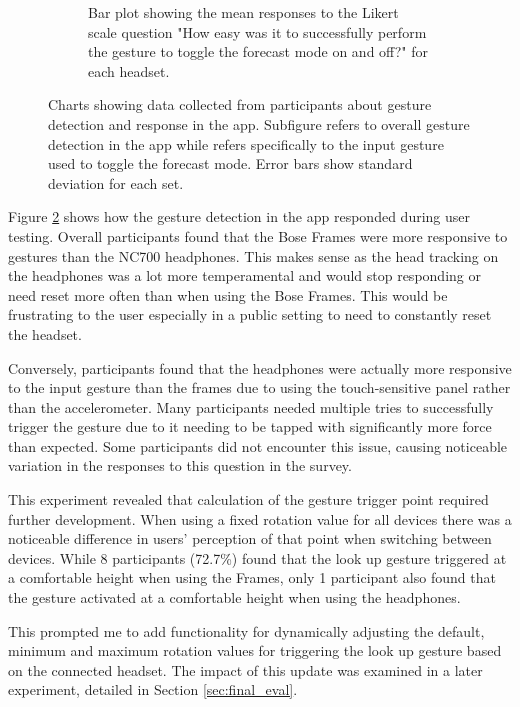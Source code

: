 \documentclass{l4proj}
\begin{document}
\begin{figure}[htb!]
\begin{subfigure}[b]{0.6\textwidth}
        \caption{Bar plot showing the mean responses to the Likert scale question "How easy was it to successfully perform the gesture to toggle the forecast mode on and off?" for each headset.}
        \label{fig:syn2}
    \end{subfigure}
    \caption{Charts showing data collected from participants about gesture detection and response in the app. Subfigure  refers to overall gesture detection in the app while  refers specifically to the input gesture used to toggle the forecast mode. Error bars show standard deviation for each set.
    }\label{fig:gesture_dection_graphs}
\end{figure}

Figure \ref{fig:gesture_dection_graphs} shows how the gesture detection in the app responded during user testing. Overall participants found that the Bose Frames were more responsive to gestures than the NC700 headphones. This makes sense as the head tracking on the headphones was a lot more temperamental and would stop responding or need reset more often than when using the Bose Frames. This would be frustrating to the user especially in a public setting to need to constantly reset the headset.

Conversely, participants found that the headphones were actually more responsive to the input gesture than the frames due to using the touch-sensitive panel rather than the accelerometer. Many participants needed multiple tries to successfully trigger the gesture due to it needing to be tapped with significantly more force than expected. Some participants did not encounter this issue, causing noticeable variation in the responses to this question in the survey.

This experiment revealed that calculation of the gesture trigger point required further development. When using a fixed rotation value for all devices there was a noticeable difference in users' perception of that point when switching between devices. While 8 participants (\num{72.7}\%) found that the look up gesture triggered at a comfortable height when using the Frames, only 1 participant also found that the gesture activated at a comfortable height when using the headphones.

This prompted me to add functionality for dynamically adjusting the default, minimum and maximum rotation values for triggering the look up gesture based on the connected headset. The impact of this update was examined in a later experiment, detailed in Section \ref{sec:final_eval}.
\end{document}
